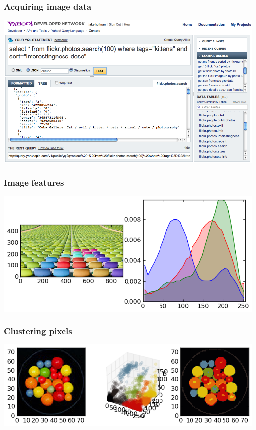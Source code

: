 \begin{frame}
  \frametitle{Acquiring image data}

  \begin{center}
  \includegraphics[width=\textwidth]{yql_console.png}
  \end{center}

\end{frame}


\begin{frame}
  \frametitle{Image features}

  \begin{center}
  \includegraphics[width=\textwidth]{../../code/image_data/chairs_32.png}
  \end{center}

\end{frame}


\begin{frame}
  \frametitle{Clustering pixels}

  \begin{center}
    \includegraphics[width=\textwidth]{../../code/image_data/candy_clustered.png}
  \end{center}

\end{frame}


